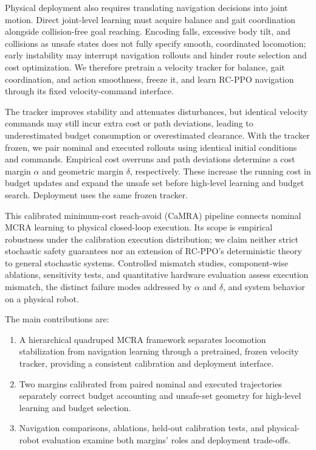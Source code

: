 \documentclass[conference]{IEEEtran}
\begin{document}
Physical deployment also requires translating navigation decisions into joint
motion. Direct joint-level learning must acquire balance and gait coordination
alongside collision-free goal reaching. Encoding falls, excessive body tilt, and
collisions as unsafe states does not fully specify smooth, coordinated locomotion;
early instability may interrupt navigation rollouts and hinder route selection
and cost optimization. We therefore pretrain a velocity tracker for balance,
gait coordination, and action smoothness, freeze it, and learn RC-PPO navigation
through its fixed velocity-command interface.

The tracker improves stability and attenuates disturbances, but identical velocity
commands may still incur extra cost or path deviations, leading to underestimated
budget consumption or overestimated clearance. With the tracker frozen, we pair
nominal and executed rollouts using identical initial conditions and commands.
Empirical cost overruns and path deviations determine a cost margin $\alpha$ and
geometric margin $\delta$, respectively. These increase the running cost in
budget updates and expand the unsafe set before high-level learning and budget
search. Deployment uses the same frozen tracker.

This calibrated minimum-cost reach-avoid (CaMRA) pipeline connects nominal MCRA
learning to physical closed-loop execution. Its scope is empirical robustness
under the calibration execution distribution; we claim neither strict stochastic
safety guarantees nor an extension of RC-PPO's deterministic theory to general
stochastic systems. Controlled mismatch studies, component-wise ablations,
sensitivity tests, and quantitative hardware evaluation assess execution
mismatch, the distinct failure modes addressed by $\alpha$ and $\delta$, and
system behavior on a physical robot.

The main contributions are:
\begin{enumerate}
\item A hierarchical quadruped MCRA framework separates locomotion stabilization
      from navigation learning through a pretrained, frozen velocity tracker,
      providing a consistent calibration and deployment interface.
\item Two margins calibrated from paired nominal and executed trajectories
      separately correct budget accounting and unsafe-set geometry for
      high-level learning and budget selection.
\item Navigation comparisons, ablations, held-out calibration tests, and
      physical-robot evaluation examine both margins' roles and deployment
      trade-offs.
\end{enumerate}
\end{document}
